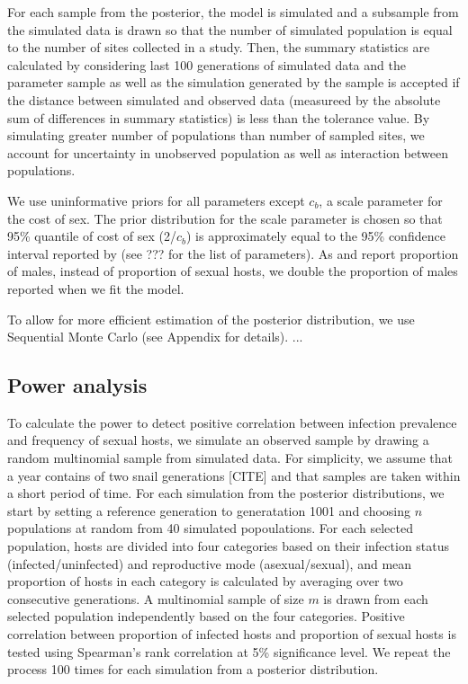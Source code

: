 \documentclass{article}\usepackage[]{graphicx}\usepackage[]{color}
\begin{document}
For each sample from the posterior, the model is simulated and a subsample from the simulated data is drawn so that the number of simulated population is equal to the number of sites collected in a study.
Then, the summary statistics are calculated by considering last 100 generations of simulated data and the parameter sample as well as the simulation generated by the sample is accepted if the distance between simulated and observed data (measureed by the absolute sum of differences in summary statistics) is less than the tolerance value.
By simulating greater number of populations than number of sampled sites, we account for uncertainty in unobserved population as well as interaction between populations.

We use uninformative priors for all parameters except $c_b$, a scale parameter for the cost of sex.
The prior distribution for the scale parameter is chosen so that 95\% quantile of cost of sex (2/$c_b$) is approximately equal to the 95\% confidence interval reported by \cite{gibson2017two} (see ??? for the list of parameters).
As \cite{dagan2013clonal} and \cite{mckone2016fine} report proportion of males, instead of proportion of sexual hosts, we double the proportion of males reported when we fit the model.

To allow for more efficient estimation of the posterior distribution, we use Sequential Monte Carlo \cite{turner2012tutorial} (see Appendix for details).
...

\subsection{Power analysis}


To calculate the power to detect positive correlation between infection prevalence and frequency of sexual hosts, we simulate an observed sample by drawing a random multinomial sample from simulated data.
For simplicity, we assume that a year contains of two snail generations [CITE] and that samples are taken within a short period of time.
For each simulation from the posterior distributions, we start by setting a reference generation to generatation 1001 and choosing $n$ populations at random from 40 simulated popoulations.
For each selected population, hosts are divided into four categories based on their infection status (infected/uninfected) and reproductive mode (asexual/sexual),
and mean proportion of hosts in each category is calculated by averaging over two consecutive generations.
A multinomial sample of size $m$ is drawn from each selected population independently based on the four categories. 
Positive correlation between proportion of infected hosts and proportion of sexual hosts is tested using Spearman's rank correlation at 5\% significance level.
We repeat the process 100 times for each simulation from a posterior distribution.
\end{document}
